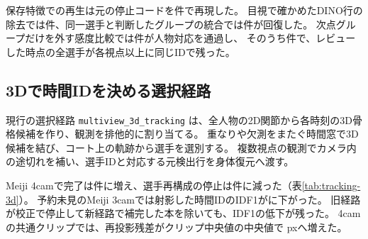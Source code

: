 保存特徴での再生は元の停止コードを件で再現した。
目視で確かめたDINO行の除去では件、同一選手と判断したグループの統合では件が回復した。
次点グループだけを外す感度比較では件が人物対応を通過し、
そのうち件で、レビューした時点の全選手が各視点以上に同じIDで残った。

\subsection{3Dで時間IDを決める選択経路}

現行の選択経路 \texttt{multiview\_3d\_tracking} は、全人物の2D関節から各時刻の3D骨格候補を作り、観測を排他的に割り当てる。
重なりや欠測をまたぐ時間窓で3D候補を結び、コート上の軌跡から選手を選別する。
複数視点の観測でカメラ内の途切れを補い、選手IDと対応する元検出行を身体復元へ渡す。

\begin{table}[tbp]
\centering
\caption{旧経路と3D時間追跡の比較。計測版は統合前の開発ブランチ。
4camでは同じ幾何と球を使い、全選手の身体復元・配置と球3Dを確認できたクリップを完了とした。
方式ごとに、関節の推定に使わなかった観測を採点し、クリップごとに再投影残差の中央値を求めた。}
\label{tab:tracking-3d}
\small

\end{table}

Meiji 4camで完了は件に増え、選手再構成の停止は件に減った（表\ref{tab:tracking-3d}）。
予約未見のMeiji 3camでは射影した時間IDのIDF1がに下がった。
旧経路が校正で停止して新経路で補完した本を除いても、IDF1の低下が残った。
4camの共通クリップでは、再投影残差がクリップ中央値の中央値で pxへ増えた。
